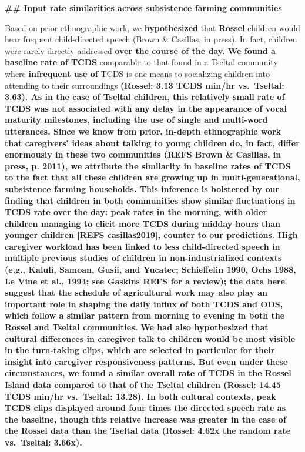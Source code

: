 \documentclass[,man,floatsintext]{apa6}
\begin{document}
\textbf{\#\# Input rate similarities across subsistence farming
communities}

Based on prior ethnographic work, we \textbf{hypothesized} that
\textbf{Rossel} children would hear frequent child-directed speech
(Brown \& Casillas, in press). In fact, children were rarely directly
addressed \textbf{over the course of the day. We found a baseline rate
of TCDS} comparable to that found in a Tseltal community where
\textbf{infrequent use of} TCDS is one means to socializing children
into attending to their surroundings \textbf{(Rossel: 3.13 TCDS min/hr
vs.~Tseltal: 3.63). As in the case of Tseltal children, this relatively
small rate of TCDS was not associated with any delay in the appearance
of vocal maturity milestones, including the use of single and multi-word
utterances. Since we know from prior, in-depth ethnographic work that
caregivers' ideas about talking to young children do, in fact, differ
enormously in these two communities (REFS Brown \& Casillas, in press,
p. 2011), we attribute the similarity in baseline rates of TCDS to the
fact that all these children are growing up in multi-generational,
subsistence farming households. This inference is bolstered by our
finding that children in both communities show similar fluctuations in
TCDS rate over the day: peak rates in the morning, with older children
managing to elicit more TCDS during midday hours than younger children
{[}REFS casillas2019{]}, counter to our predictions. High caregiver
workload has been linked to less child-directed speech in multiple
previous studies of children in non-industrialized contexts (e.g.,
Kaluli, Samoan, Gusii, and Yucatec; Schieffelin 1990, Ochs 1988, Le Vine
et al., 1994; see Gaskins REFS for a review); the data here suggest that
the schedule of agricultural work may also play an important role in
shaping the daily influx of both TCDS and ODS, which follow a similar
pattern from morning to evening in both the Rossel and Tseltal
communities. We had also hypothesized that cultural differences in
caregiver talk to children would be most visible in the turn-taking
clips, which are selected in particular for their insight into caregiver
responsiveness patterns. But even under these circumstances, we found a
similar overall rate of TCDS in the Rossel Island data compared to that
of the Tseltal children (Rossel: 14.45 TCDS min/hr vs.~Tseltal: 13.28).
In both cultural contexts, peak TCDS clips displayed around four times
the directed speech rate as the baseline, though this relative increase
was greater in the case of the Rossel data than the Tseltal data
(Rossel: 4.62x the random rate vs.~Tseltal: 3.66x).}
\end{document}
